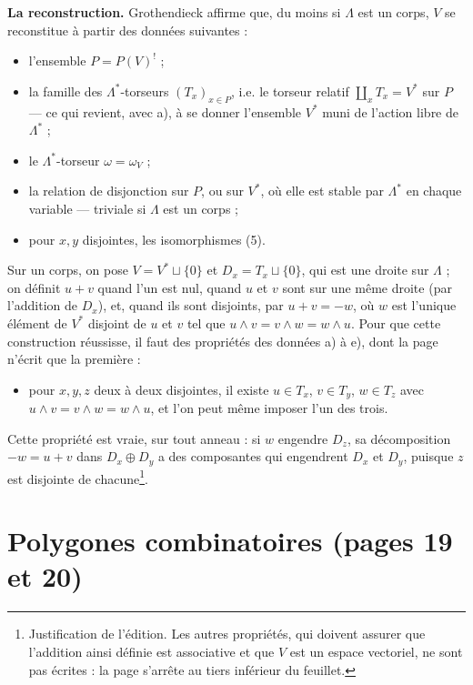 \documentclass[11pt,a4paper]{article}
\begin{document}
\textbf{La reconstruction.} Grothendieck affirme que, du moins si $\Lambda$ est un
corps, $V$ se reconstitue à partir des données suivantes :
\begin{itemize}
  \item[a)] l'ensemble $P = P(V)^{!}$ ;
  \item[b)] la famille des $\Lambda^{*}$-torseurs $(T_x)_{x \in P}$, i.e. le torseur
    relatif $\coprod_x T_x = V^{*}$ sur $P$ — ce qui revient, avec a), à se donner
    l'ensemble $V^{*}$ muni de l'action libre de $\Lambda^{*}$ ;
  \item[c)] le $\Lambda^{*}$-torseur $\omega = \omega_V$ ;
  \item[d)] la relation de disjonction sur $P$, ou sur $V^{*}$, où elle est stable
    par $\Lambda^{*}$ en chaque variable — triviale si $\Lambda$ est un corps ;
  \item[e)] pour $x, y$ disjointes, les isomorphismes (5).
\end{itemize}
Sur un corps, on pose $V = V^{*} \sqcup \{0\}$ et $D_x = T_x \sqcup \{0\}$, qui est une
droite sur $\Lambda$ ; on définit $u + v$ quand l'un est nul, quand $u$ et $v$ sont
sur une même droite (par l'addition de $D_x$), et, quand ils sont disjoints, par
$u + v = -w$, où $w$ est l'unique élément de $V^{*}$ disjoint de $u$ et $v$ tel que
$u \wedge v = v \wedge w = w \wedge u$. Pour que cette construction réussisse, il
faut des propriétés des données a) à e), dont la page n'écrit que la première :
\begin{itemize}
  \item[a)] pour $x, y, z$ deux à deux disjointes, il existe $u \in T_x$, $v \in
    T_y$, $w \in T_z$ avec $u \wedge v = v \wedge w = w \wedge u$, et l'on peut même
    imposer l'un des trois.
\end{itemize}
Cette propriété est vraie, sur tout anneau : si $w$ engendre $D_z$, sa
décomposition $-w = u + v$ dans $D_x \oplus D_y$ a des composantes qui engendrent
$D_x$ et $D_y$, puisque $z$ est disjointe de chacune\footnote{Justification de
l'édition. Les autres propriétés, qui doivent assurer que l'addition ainsi
définie est associative et que $V$ est un espace vectoriel, ne sont pas écrites
: la page s'arrête au tiers inférieur du feuillet.}.

\section*{Polygones combinatoires (pages 19 et 20)}
\end{document}
